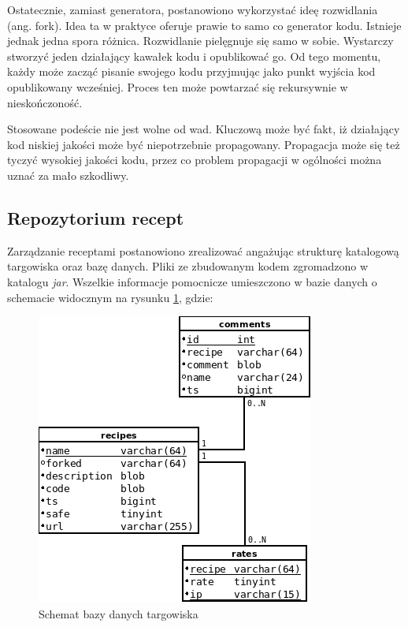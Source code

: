 \documentclass[11pt,a4paper,polish,thesis]{dcsbook}
\begin{document}
Ostatecznie, zamiast generatora, postanowiono wykorzystać ideę rozwidlania (ang. fork). Idea ta w praktyce oferuje prawie to samo co generator kodu. Istnieje jednak
jedna spora różnica. Rozwidlanie pielęgnuje się samo w sobie. Wystarczy stworzyć jeden działający kawałek kodu i opublikować go. Od tego momentu, każdy może zacząć pisanie swojego kodu przyjmując jako punkt wyjścia kod opublikowany wcześniej. Proces ten może powtarzać się rekursywnie w nieskończoność.

Stosowane podeście nie jest wolne od wad. Kluczową może być fakt, iż działający kod niskiej jakości może być niepotrzebnie propagowany. Propagacja może się też tyczyć
wysokiej jakości kodu, przez co problem propagacji w ogólności można uznać za mało szkodliwy.
\subsection{Repozytorium recept}
Zarządzanie receptami postanowiono zrealizować angażując strukturę katalogową targowiska oraz bazę danych. Pliki ze zbudowanym kodem zgromadzono w katalogu \emph{jar}.
Wszelkie informacje pomocnicze umieszczono w bazie danych o schemacie widocznym na rysunku \ref{fig:market_db}, gdzie:
\begin{figure}[p]
  \centering
  \includegraphics[scale=0.7]{./resources/market_db.png}
  \caption{Schemat bazy danych targowiska}
  \label{fig:market_db}
\end{figure}
\end{document}
